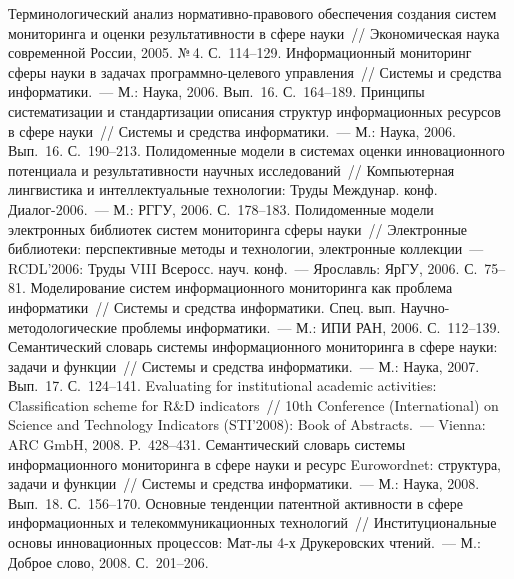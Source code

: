 \begin{multicols}{2}
{{\begin{thebibliography}{99}
 Терминологический анализ нор\-ма\-тив\-но-пра\-во\-во\-го обеспечения создания 
сис\-тем мониторинга и оценки результативности в сфере науки~// Экономическая наука современной 
России, 2005. №\,4. С.~114--129.
 Информационный мониторинг сферы науки в задачах 
про\-грам\-мно-це\-ле\-во\-го управ\-ле\-ния~// Сис\-те\-мы и средства информатики.~--- М.: Наука, 2006. 
Вып.~16. С.~164--189.
 Принципы систематизации и стандартизации 
описания структур информационных ресурсов в сфере науки~// Системы и средства информатики.~--- 
М.: Наука, 2006. Вып.~16. С.~190--213.
 Полидоменные модели в системах оценки инновационного потенциала и 
результативности научных исследований~// Компьютерная лингвистика и интеллектуальные 
технологии: Труды Междунар. конф. Диалог-2006.~--- М.: РГГУ, 2006. С.~178--183.
 Полидоменные модели электронных библиотек систем мониторинга сферы науки~// 
Электронные библиотеки: перспективные методы и технологии, электронные коллекции~--- 
RCDL'2006: Труды VIII Всеросс. науч. конф.~--- Ярославль: ЯрГУ, 2006. С.~75--81.
Моделирование систем информационного мониторинга как проблема информатики~// Системы и 
средства информатики. Спец. вып. Научно-методологические проблемы информатики.~--- М.: ИПИ РАН, 
2006. С.~112--139.
 Семантический словарь системы информационного мониторинга в 
сфере науки: задачи и функции~// Системы и средства информатики.~--- М.: Наука, 2007. Вып.~17. 
С.~124--141.
 Evaluating for institutional academic activities: Classification scheme for R\&D 
indicators~// 10th Conference (International) on Science and Technology Indicators (STI'2008): Book of 
Abstracts.~--- Vienna: ARC GmbH, 2008. P.~428--431.
 Семантический словарь системы информационного мониторинга в сфере науки и 
ресурс Eurowordnet: структура, задачи и функции~// Сис\-те\-мы и средства информатики.~--- М.: Наука, 
2008. Вып.~18. С.~156--170.
 Основные тенденции патентной активности в сфере 
информационных и телекоммуникационных технологий~// Институциональные основы инновационных 
процессов: Мат-лы 4-х Друкеровских чтений.~--- М.: Доброе слово, 2008. С.~201--206.

\end{thebibliography}}}
\end{multicols}

